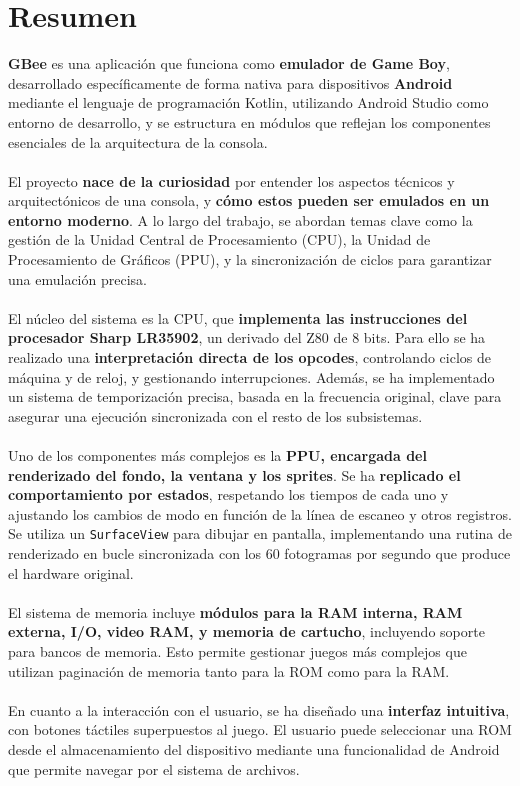 \chapter*{Resumen}
\label{resumen}
\textbf{GBee} es una aplicación que funciona como \textbf{emulador de Game Boy}, desarrollado específicamente de forma nativa para dispositivos \textbf{Android} mediante el lenguaje de programación Kotlin, utilizando Android Studio como entorno de desarrollo, y se estructura en módulos que reflejan los componentes esenciales de la arquitectura de la consola.
\\\\
El proyecto \textbf{nace de la curiosidad} por entender los aspectos técnicos y arquitectónicos de una consola, y \textbf{cómo estos pueden ser emulados en un entorno moderno}. A lo largo del trabajo, se abordan temas clave como la gestión de la Unidad Central de Procesamiento (CPU), la Unidad de Procesamiento de Gráficos (PPU), y la sincronización de ciclos para garantizar una emulación precisa.
\\\\
El núcleo del sistema es la CPU, que \textbf{implementa las instrucciones del procesador Sharp LR35902}, un derivado del Z80 de 8 bits. Para ello se ha realizado una \textbf{interpretación directa de los opcodes}, controlando ciclos de máquina y de reloj, y gestionando interrupciones. Además, se ha implementado un sistema de temporización precisa, basada en la frecuencia original, clave para asegurar una ejecución sincronizada con el resto de los subsistemas.
\\\\
Uno de los componentes más complejos es la \textbf{PPU, encargada del renderizado del fondo, la ventana y los sprites}. Se ha \textbf{replicado el comportamiento por estados}, respetando los tiempos de cada uno y ajustando los cambios de modo en función de la línea de escaneo y otros registros. Se utiliza un \texttt{SurfaceView} para dibujar en pantalla, implementando una rutina de renderizado en bucle sincronizada con los 60 fotogramas por segundo que produce el hardware original.
\\\\
El sistema de memoria incluye \textbf{módulos para la RAM interna, RAM externa, I/O, video RAM, y memoria de cartucho}, incluyendo soporte para bancos de memoria. Esto permite gestionar juegos más complejos que utilizan paginación de memoria tanto para la ROM como para la RAM.
\\\\
En cuanto a la interacción con el usuario, se ha diseñado una \textbf{interfaz intuitiva}, con botones táctiles superpuestos al juego. El usuario puede seleccionar una ROM desde el almacenamiento del dispositivo mediante una funcionalidad de Android que permite navegar por el sistema de archivos.

\cleardoublepage